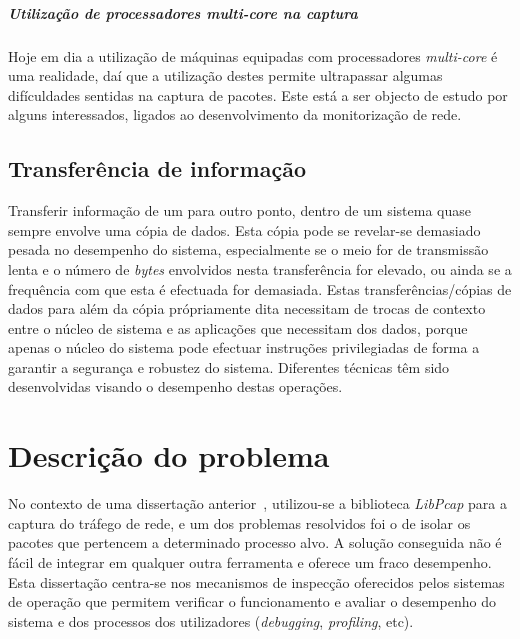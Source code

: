 \subparagraph*{Utilização de processadores \textit{multi-core} na captura}
Hoje em dia a utilização de máquinas equipadas com processadores \textit{multi-core} é uma realidade, daí que a utilização destes permite ultrapassar algumas difículdades sentidas na captura de pacotes.
Este está a ser objecto de estudo por alguns interessados, ligados ao desenvolvimento da monitorização de rede.


\subsection{Transferência de informação}\label{sect:transf_information}


Transferir informação de um para outro ponto, dentro de um sistema quase sempre envolve uma cópia de dados.
Esta cópia pode se revelar-se demasiado pesada no desempenho do sistema, especialmente se o meio for de transmissão lenta e o número de \textit{bytes} envolvidos nesta transferência for elevado, ou ainda se a frequência com que esta é efectuada for demasiada.
Estas transferências/cópias de dados para além da cópia própriamente dita necessitam de trocas de contexto entre o núcleo de sistema e as aplicações que necessitam dos dados, porque apenas o núcleo do sistema pode efectuar instruções privilegiadas de forma a garantir a segurança e robustez do sistema.
Diferentes técnicas têm sido desenvolvidas visando o desempenho destas operações. 


\section{Descrição do problema} \label{sect:descricao_prob}
 No contexto de uma dissertação anterior~\cite{Farruca:2009}, utilizou-se a biblioteca \textit{LibPcap} para a captura do tráfego de rede, e um dos problemas resolvidos foi o de isolar os pacotes que pertencem a determinado processo alvo.
A solução conseguida não é fácil de integrar em qualquer outra ferramenta e oferece um fraco desempenho.
Esta dissertação centra-se nos mecanismos de inspecção oferecidos pelos sistemas de operação que permitem verificar o funcionamento e avaliar o desempenho do sistema e dos processos dos utilizadores (\textit{debugging}, \textit{profiling}, etc).

